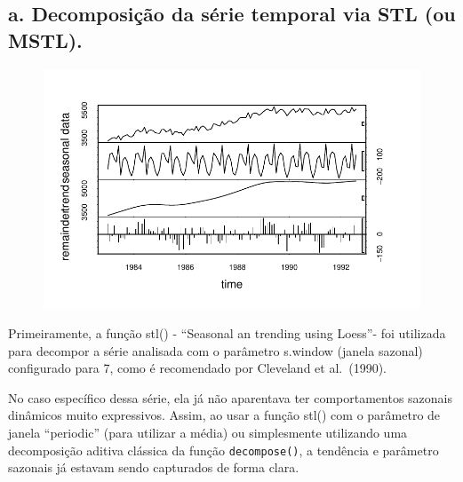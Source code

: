 \documentclass[
  letterpaper,
  DIV=11,
  numbers=noendperiod]{scrartcl}
\newenvironment{Shaded}{\begin{snugshade}}{\end{snugshade}}
\newcommand{\AttributeTok}[1]{\textcolor[rgb]{0.40,0.45,0.13}{#1}}
\newcommand{\CommentTok}[1]{\textcolor[rgb]{0.37,0.37,0.37}{#1}}
\newcommand{\DecValTok}[1]{\textcolor[rgb]{0.68,0.00,0.00}{#1}}
\newcommand{\FunctionTok}[1]{\textcolor[rgb]{0.28,0.35,0.67}{#1}}
\newcommand{\NormalTok}[1]{\textcolor[rgb]{0.00,0.23,0.31}{#1}}
\newcommand{\OtherTok}[1]{\textcolor[rgb]{0.00,0.23,0.31}{#1}}
\newcommand{\SpecialCharTok}[1]{\textcolor[rgb]{0.37,0.37,0.37}{#1}}
\begin{document}
\hypertarget{a.-decomposiuxe7uxe3o-da-suxe9rie-temporal-via-stl-ou-mstl.}{%
\subsection{a. Decomposição da série temporal via STL (ou
MSTL).}\label{a.-decomposiuxe7uxe3o-da-suxe9rie-temporal-via-stl-ou-mstl.}}

\begin{Shaded}
\end{Shaded}

\begin{figure}[H]

{\centering \includegraphics{Trabalhao1_ST_grupo5_2023_05_16_files/figure-pdf/unnamed-chunk-3-1.pdf}

}

\end{figure}

Primeiramente, a função stl() - ``Seasonal an trending using Loess''-
foi utilizada para decompor a série analisada com o parâmetro s.window
(janela sazonal) configurado para 7, como é recomendado por Cleveland et
al.~(1990).

No caso específico dessa série, ela já não aparentava ter comportamentos
sazonais dinâmicos muito expressivos. Assim, ao usar a função stl() com
o parâmetro de janela ``periodic'' (para utilizar a média) ou
simplesmente utilizando uma decomposição aditiva clássica da função
\texttt{decompose()}, a tendência e parâmetro sazonais já estavam sendo
capturados de forma clara.
\end{document}
